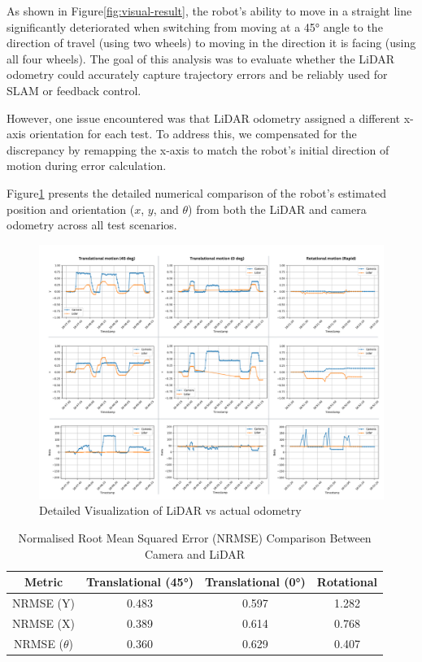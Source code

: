 As shown in Figure\ref{fig:visual-result}, the robot’s ability to move in a straight line significantly deteriorated when switching from moving at a 45° angle to the direction of travel (using two wheels) to moving in the direction it is facing (using all four wheels). The goal of this analysis was to evaluate whether the LiDAR odometry could accurately capture trajectory errors and be reliably used for SLAM or feedback control.

However, one issue encountered was that LiDAR odometry assigned a different x-axis orientation for each test. To address this, we compensated for the discrepancy by remapping the x-axis to match the robot’s initial direction of motion during error calculation.

Figure\ref{fig:detail-result} presents the detailed numerical comparison of the robot's estimated position and orientation ($x$, $y$, and $\theta$) from both the LiDAR and camera odometry across all test scenarios.


\begin{figure}[H]
    \centering
    \includegraphics[width=1\linewidth]{assets/images/odometry/detail_visual.png}
    \caption{Detailed Visualization of LiDAR vs actual odometry}
    \label{fig:detail-result}
\end{figure}

\begin{table}[H]
\centering
\begin{tabular}{|c|c|c|c|}
\hline
\textbf{Metric} & \textbf{Translational (45°)} & \textbf{Translational (0°)} & \textbf{Rotational} \\
\hline
NRMSE (Y) & 0.483 & 0.597 & 1.282 \\
NRMSE (X) & 0.389 & 0.614 & 0.768 \\
NRMSE ($\theta$) & 0.360 & 0.629 & 0.407 \\
\hline
\end{tabular}
\caption{Normalised Root Mean Squared Error (NRMSE) Comparison Between Camera and LiDAR}
\label{tab:mse-results}
\end{table}


